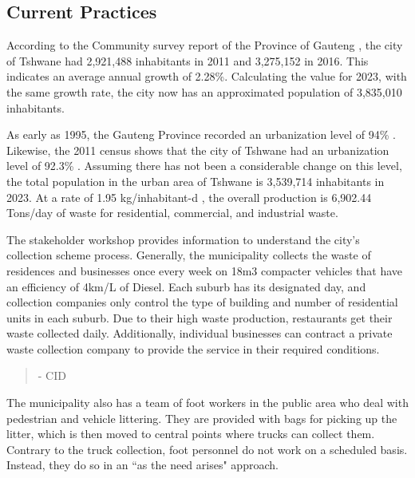 \documentclass[authoryear,preprint,review,12pt]{elsarticle}
\begin{document}
    \subsection{Current Practices}
    According to the Community survey report of the Province of Gauteng \citep{africaProvincialProfileGauteng2018}, the city of Tshwane had 2,921,488 inhabitants in 2011 and 3,275,152 in 2016. This indicates an average annual growth of 2.28\%. Calculating the value for 2023, with the same growth rate, the city now has an approximated population of 3,835,010 inhabitants.

    As early as 1995, the Gauteng Province recorded an urbanization level of 94\% \citep{serviceLivingGautengSelected1997}. Likewise, the 2011 census shows that the city of Tshwane had an urbanization level of 92.3\% \citep{africaCensus20112012}. Assuming there has not been a considerable change on this level, the total population in the urban area of Tshwane is 3,539,714 inhabitants in 2023. At a rate of 1.95 kg/inhabitant-d \citep{tshwaneCityTshwane20222022}, the overall production is 6,902.44 Tons/day of waste for residential, commercial, and industrial waste.

    The stakeholder workshop provides information to understand the city's collection scheme process. Generally, the municipality collects the waste of residences and businesses once every week on 18m3 compacter vehicles that have an efficiency of 4km/L of Diesel. Each suburb has its designated day, and collection companies only control the type of building and number of residential units in each suburb. Due to their high waste production, restaurants get their waste collected daily. Additionally, individual businesses can contract a private waste collection company to provide the service in their required conditions.
    \begin{quotation}
          - CID
        
    \end{quotation}

    The municipality also has a team of foot workers in the public area who deal with pedestrian and vehicle littering. They are provided with bags for picking up the litter, which is then moved to central points where trucks can collect them. Contrary to the truck collection, foot personnel do not work on a scheduled basis. Instead, they do so in an “as the need arises" approach.
\end{document}
